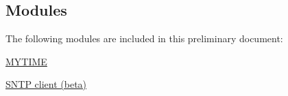 \hypertarget{index_modules}{}\subsection{Modules}\label{index_modules}
The following modules are included in this preliminary document\+:
\begin{DoxyItemize}
\item \hyperlink{mytime_8h}{M\+Y\+T\+I\+M\+E}
\item \hyperlink{sntp_8h}{S\+N\+T\+P client (beta)} 
\end{DoxyItemize}